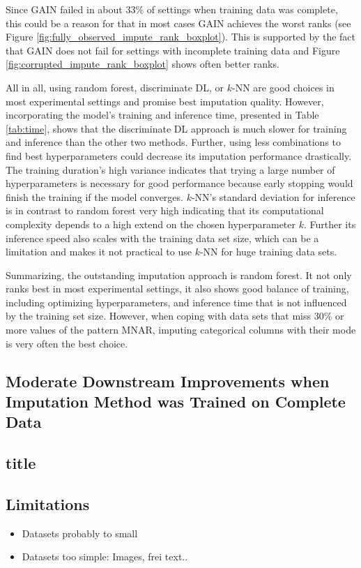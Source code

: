 Since GAIN failed in about $33\%$ of settings when training data was complete, this could be a reason for that in most cases GAIN achieves the worst ranks (see Figure \ref{fig:fully_observed_impute_rank_boxplot}). This is supported by the fact that GAIN does not fail for settings with incomplete training data and Figure \ref{fig:corrupted_impute_rank_boxplot} shows often better ranks.

All in all, using random forest, discriminate DL, or $k$-NN are good choices in most experimental settings and promise best imputation quality. However, incorporating the model's training and inference time, presented in Table \ref{tab:time}, shows that the discriminate DL approach is much slower for training and inference than the other two methods. Further, using less combinations to find best hyperparameters could decrease its imputation performance drastically. The training duration's high variance indicates that trying a large number of hyperparameters is necessary for good performance because early stopping would finish the training if the model converges. $k$-NN's standard deviation for inference is in contrast to random forest very high indicating that its computational complexity depends to a high extend on the chosen hyperparameter $k$. Further its inference speed also scales with the training data set size, which can be a limitation and makes it not practical to use $k$-NN for huge training data sets.

Summarizing, the outstanding imputation approach is random forest. It not only ranks best in most experimental settings, it also shows good balance of training, including optimizing hyperparameters, and inference time that is not influenced by the training set size. However, when coping with data sets that miss $30\%$ or more values of the pattern MNAR, imputing categorical columns with their mode is very often the best choice.




\subsection{Moderate Downstream Improvements when Imputation Method was Trained on Complete Data}
%


\subsection{title}


\subsection{Limitations}
%

\begin{itemize}
	\item Datasets probably to small
	\item Datasets too simple: Images, frei text..
\end{itemize}

